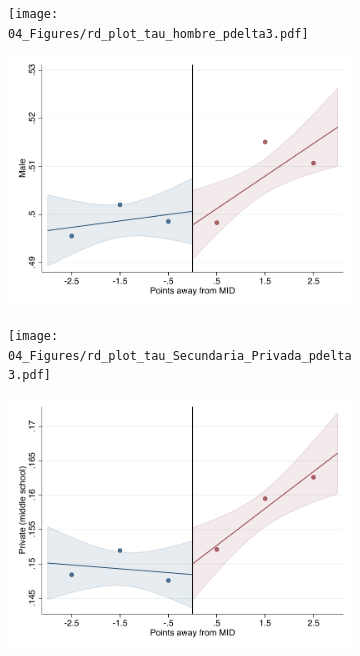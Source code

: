 \documentclass[oneside,11pt]{article}
\begin{document}
\begin{figure}[H]
\begin{center}
    \begin{subfigure}{0.475\textwidth}
        \centering
        \texttt{[image: 04\_Figures/rd\_plot\_tau\_hombre\_pdelta3.pdf]}
    \end{subfigure}
    \begin{subfigure}{0.475\textwidth}
        \centering
        \includegraphics[width=\textwidth]{04_Figures/rd_plot_mid_hombre_pdelta3.pdf}
    \end{subfigure}

    \begin{subfigure}{0.475\textwidth}
        \centering
        \texttt{[image: 04\_Figures/rd\_plot\_tau\_Secundaria\_Privada\_pdelta3.pdf]}
    \end{subfigure}
    \begin{subfigure}{0.475\textwidth}
        \centering
        \includegraphics[width=\textwidth]{04_Figures/rd_plot_mid_Secundaria_Privada_pdelta3.pdf}
    \end{subfigure}
    \end{center}
    

\end{figure}
\end{document}
